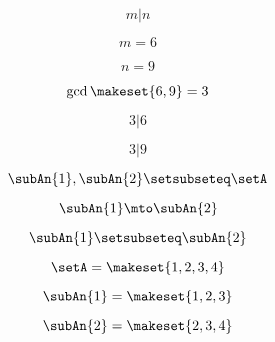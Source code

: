 \begin{forslides}
    \begin{equation}
        \label{eq:feedback-017}
        m | n
    \end{equation}

    \begin{equation}
        \label{eq:feedback-018}
        m = 6
    \end{equation}

    \begin{equation}
        \label{eq:feedback-019}
        n = 9
    \end{equation}

    \begin{equation}
        \label{eq:feedback-020}
        \gcd \makeset{6, 9 } = 3
    \end{equation}

    \begin{equation}
        \label{eq:feedback-021}
        3 | 6
    \end{equation}

    \begin{equation}
        \label{eq:feedback-022}
        3 | 9
    \end{equation}

    \begin{equation}
        \label{eq:feedback-023}
        \subAn{1}, \subAn{2} \setsubseteq \setA
    \end{equation}

    \begin{equation}
        \label{eq:feedback-024}
        \subAn{1} \mto \subAn{2}
    \end{equation}

    \begin{equation}
        \label{eq:feedback-025}
        \subAn{1} \setsubseteq \subAn{2}
    \end{equation}

    \begin{equation}
        \label{eq:feedback-026}
        \setA = \makeset{ 1, 2, 3, 4 }
    \end{equation}

    \begin{equation}
        \label{eq:feedback-027}
        \subAn{1} = \makeset{ 1, 2, 3 }
    \end{equation}

    \begin{equation}
        \label{eq:feedback-028}
        \subAn{2} = \makeset{2, 3, 4 }
    \end{equation}


\end{forslides}
